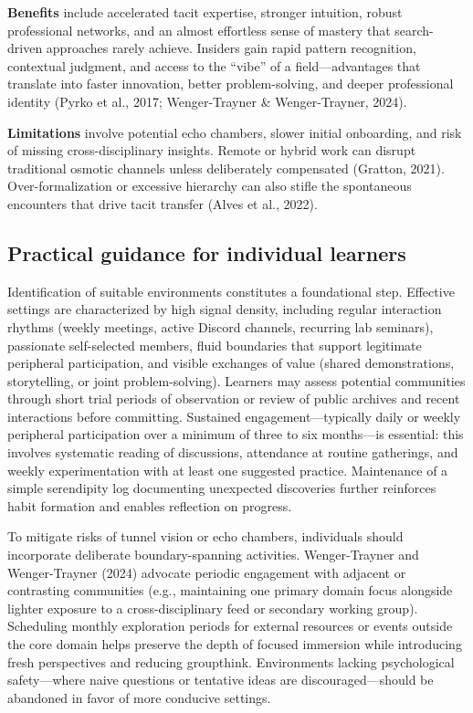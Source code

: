 \documentclass[11pt,a4paper]{article}
\begin{document}
\textbf{Benefits} include accelerated tacit expertise, stronger intuition, robust professional networks, and an almost effortless sense of mastery that search-driven approaches rarely achieve. Insiders gain rapid pattern recognition, contextual judgment, and access to the ``vibe'' of a field---advantages that translate into faster innovation, better problem-solving, and deeper professional identity (Pyrko et al., 2017; Wenger-Trayner \& Wenger-Trayner, 2024).

\textbf{Limitations} involve potential echo chambers, slower initial onboarding, and risk of missing cross-disciplinary insights. Remote or hybrid work can disrupt traditional osmotic channels unless deliberately compensated (Gratton, 2021). Over-formalization or excessive hierarchy can also stifle the spontaneous encounters that drive tacit transfer (Alves et al., 2022).

\subsection{Practical guidance for individual learners}
Identification of suitable environments constitutes a foundational step. Effective settings are characterized by high signal density, including regular interaction rhythms (weekly meetings, active Discord channels, recurring lab seminars), passionate self-selected members, fluid boundaries that support legitimate peripheral participation, and visible exchanges of value (shared demonstrations, storytelling, or joint problem-solving). Learners may assess potential communities through short trial periods of observation or review of public archives and recent interactions before committing. Sustained engagement---typically daily or weekly peripheral participation over a minimum of three to six months---is essential: this involves systematic reading of discussions, attendance at routine gatherings, and weekly experimentation with at least one suggested practice. Maintenance of a simple serendipity log documenting unexpected discoveries further reinforces habit formation and enables reflection on progress.

To mitigate risks of tunnel vision or echo chambers, individuals should incorporate deliberate boundary-spanning activities. Wenger-Trayner and Wenger-Trayner (2024) advocate periodic engagement with adjacent or contrasting communities (e.g., maintaining one primary domain focus alongside lighter exposure to a cross-disciplinary feed or secondary working group). Scheduling monthly exploration periods for external resources or events outside the core domain helps preserve the depth of focused immersion while introducing fresh perspectives and reducing groupthink. Environments lacking psychological safety---where naive questions or tentative ideas are discouraged---should be abandoned in favor of more conducive settings.
\end{document}
